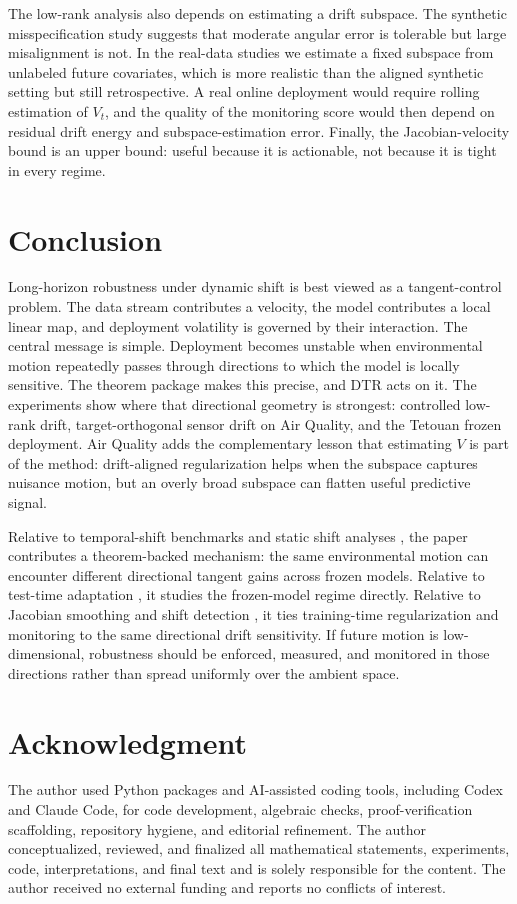 \documentclass[conference]{IEEEtran}
\begin{document}
The low-rank analysis also depends on estimating a drift subspace. The synthetic misspecification study suggests that moderate angular error is tolerable but large misalignment is not. In the real-data studies we estimate a fixed subspace from unlabeled future covariates, which is more realistic than the aligned synthetic setting but still retrospective. A real online deployment would require rolling estimation of $V_t$, and the quality of the monitoring score would then depend on residual drift energy and subspace-estimation error. Finally, the Jacobian-velocity bound is an upper bound: useful because it is actionable, not because it is tight in every regime.

\section{Conclusion}
Long-horizon robustness under dynamic shift is best viewed as a tangent-control problem. The data stream contributes a velocity, the model contributes a local linear map, and deployment volatility is governed by their interaction. The central message is simple. Deployment becomes unstable when environmental motion repeatedly passes through directions to which the model is locally sensitive. The theorem package makes this precise, and DTR acts on it. The experiments show where that directional geometry is strongest: controlled low-rank drift, target-orthogonal sensor drift on Air Quality, and the Tetouan frozen deployment. Air Quality adds the complementary lesson that estimating $V$ is part of the method: drift-aligned regularization helps when the subspace captures nuisance motion, but an overly broad subspace can flatten useful predictive signal.

Relative to temporal-shift benchmarks and static shift analyses \cite{ben-david-shift,koh-wilds,yao-wildtime,han-temporal}, the paper contributes a theorem-backed mechanism: the same environmental motion can encounter different directional tangent gains across frozen models. Relative to test-time adaptation \cite{sun-ttt,wang-tent,gui-atta}, it studies the frozen-model regime directly. Relative to Jacobian smoothing and shift detection \cite{sokolic-jacobian,kim-jacobian,rabanser-shift,cooper-allerton2024}, it ties training-time regularization and monitoring to the same directional drift sensitivity. If future motion is low-dimensional, robustness should be enforced, measured, and monitored in those directions rather than spread uniformly over the ambient space.

\section*{Acknowledgment}
The author used Python packages and AI-assisted coding tools, including Codex and Claude Code, for code development, algebraic checks, proof-verification scaffolding, repository hygiene, and editorial refinement. The author conceptualized, reviewed, and finalized all mathematical statements, experiments, code, interpretations, and final text and is solely responsible for the content. The author received no external funding and reports no conflicts of interest.

\balance


\end{document}
